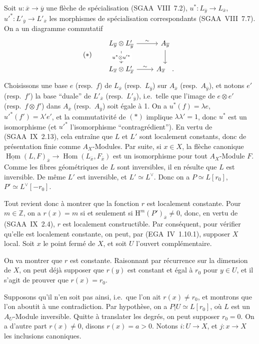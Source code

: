 \documentclass[11pt]{article}
\renewcommand{\H}{\mathrm{H}}
\DeclareMathOperator{\Hom}{Hom}
\newcommand{\Z}{\mathbb{Z}}
\newcommand{\ol}[1]{\overline{#1}}
\providecommand{\Hom}{\operatorname{Hom}}
\providecommand{\Z}{\mathbb Z}
\providecommand{\Hom}{\operatorname{Hom}}
\begin{document}
Soit $u : \ol{x} \to \ol{y}$ une flèche de spécialisation (SGAA~VIII~7.2), $u^{*} : L_{\ol{y}} \to L_{\ol{x}}$, $u'^{*} : L'_{\ol{y}} \to L'_{\ol{x}}$ les morphismes de spécialisation correspondants (SGAA~VIII~7.7). On a un diagramme commutatif
\begin{equation*}
(*)\qquad
\begin{tikzcd}
L_{\ol{y}} \otimes L'_{\ol{y}} \arrow[r,"\sim"] \arrow[d,"u^{*} \otimes u'^{*}" description] & A_{\ol{y}} \arrow[d] \\
L_{\ol{x}} \otimes L'_{\ol{x}} \arrow[r,"\sim"] & A_{\ol{x}}\quad .
\end{tikzcd}
\end{equation*}
Choisissons une base $e$ (resp.~$f$) de $L_{\ol{x}}$ (resp.~$L_{\ol{y}}$) sur $A_{\ol{x}}$ (resp.~$A_{\ol{y}}$), et notons $e'$ (resp.~$f'$) la base ``duale'' de $L'_{\ol{x}}$ (resp.~$L'_{\ol{y}}$), i.e.~telle que l'image de $e \otimes e'$ (resp.~$f \otimes f'$) dans $A_{\ol{x}}$ (resp.~$A_{\ol{y}}$) soit égale à 1. On a $u^{*}(f) = \lambda e$, $u'^{*}(f') = \lambda' e'$, et la commutativité de $(*)$ implique $\lambda\lambda' = 1$, donc $u^{*}$ est un isomorphisme (et $u'^{*}$ l'isomorphisme ``contragrédient''). En vertu de (SGAA~IX~2.13), cela entraîne que $L$ et $L'$ sont localement constants, donc de présentation finie comme $A_X$-Modules. Par suite, si $x \in X$, la flèche canonique $\underline{\Hom}(L,F)_{\ol{x}} \to \Hom(L_{\ol{x}}, F_{\ol{x}})$ est un isomorphisme pour tout $A_X$-Module $F$. Comme les fibres géométriques de $L$ sont inversibles, il en résulte que $L$ est inversible. De même $L'$ est inversible, et $L' \simeq L^{\vee}$. Donc on a $P \simeq L[r_0]$, $P' \simeq L^{\vee}[-r_0]$.

Tout revient donc à montrer que la fonction $r$ est localement constante. Pour $m \in \Z$, on a $r(x) = m$ si et seulement si $\H^{m}(P')_{\ol{x}} \neq 0$, donc, en vertu de (SGAA~IX~2.4), $r$ est localement constructible. Par conséquent,
pour vérifier qu'elle est localement constante, on peut, par (EGA~IV~1.10.1), supposer $X$ local. Soit $x$ le point fermé de $X$, et soit $U$ l'ouvert complémentaire.

On va montrer que $r$ est constante. Raisonnant par récurrence sur la dimension de $X$, on peut déjà supposer que $r(y)$ est constant et égal à $r_0$ pour $y \in U$, et il s'agit de prouver que $r(x) = r_0$.

Supposons qu'il n'en soit pas ainsi, i.e.~que l'on ait $r(x) \neq r_0$, et montrons que l'on aboutit à une contradiction. Par hypothèse, on a $P|U \simeq L[r_0]$, où $L$ est un $A_U$-Module inversible. Quitte à translater les degrés, on peut supposer $r_0 = 0$. On a d'autre part $r(x) \neq 0$, disons $r(x) = a > 0$. Notons $i : U \to X$, et $j : x \to X$ les inclusions canoniques.
\end{document}
